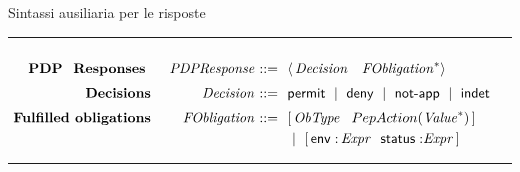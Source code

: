 \begin{table}
\footnotesize

\caption{Sintassi ausiliaria per le risposte}
\hrule
$
\begin{array}{@{\ }r@{\ \ \ \ }r@{\ }r@{\ \ }l@{\ }}

&&&\\[-.2cm]
{\textbf{PDP \ Responses }} &
\mathit{PDPResponse} & ::= & \langle \,\mathit{Decision} \ \ \ \mathit{FObligation}^* \rangle
\\[.2cm]
{\textbf{Decisions}} &
\mathit{Decision} & ::= & \permit \Sep \deny \Sep \notApp \Sep \indet
\\[.2cm]
{\textbf{Fulfilled obligations}} &
\mathit{FObligation} & ::= &  [ \, \mathit{ObType} \ \ \obl{\mathit{Value}} \, ]\\[.1cm]
&& & \Sep [ \, \x{env:} \, \mathit{Expr}\ \  \x{status:}\mathit{Expr}\, ]

\end{array}
$\\
\hrule
\label{tab:facpl_new_context_syntax}
\end{table}
